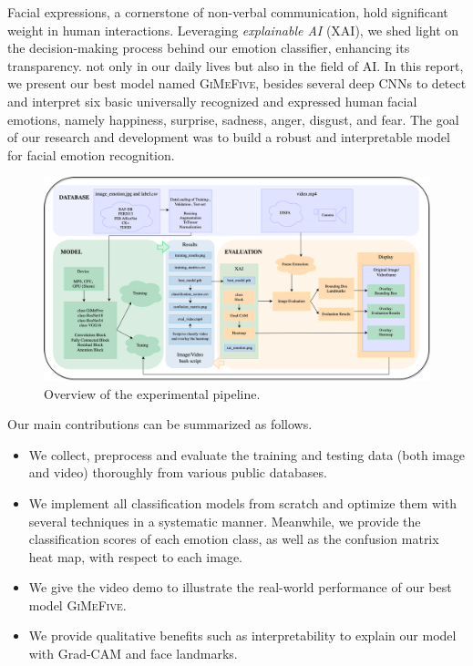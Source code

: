 Facial expressions, a cornerstone of non-verbal communication, 
hold significant weight in human interactions. 
Leveraging \textit{explainable AI} (XAI), 
we shed light on the decision-making process behind our emotion classifier, 
enhancing its transparency. 
not only in our daily lives but also in the field of AI. 
In this report, we present our best model named \textsc{GiMeFive}, 
besides several deep CNNs to detect and interpret six basic universally recognized and expressed human facial emotions, 
namely happiness, surprise, sadness, anger, disgust, and fear. 
The goal of our research and development was to build a robust and interpretable model for facial emotion recognition. 

\begin{figure}[ht]
  \centering
   \includegraphics[width=\linewidth]{pipeline.png}
   \caption{Overview of the experimental pipeline.} 
   \label{fig:pipeline}
\end{figure}

Our main contributions can be summarized as follows. 
\begin{itemize}
  \item We collect, preprocess and evaluate the training and testing data 
  (both image and video) thoroughly from various public databases. 
  \item We implement all classification models from scratch and optimize them with several techniques in a systematic manner. 
  Meanwhile, we provide the classification scores of each emotion class, 
  as well as the confusion matrix heat map, with respect to each image. 
  \item We give the video demo to illustrate the real-world performance of our best model \textsc{GiMeFive}. 
  \item We provide qualitative benefits such as interpretability to explain our model with Grad-CAM and face landmarks.
\end{itemize}

